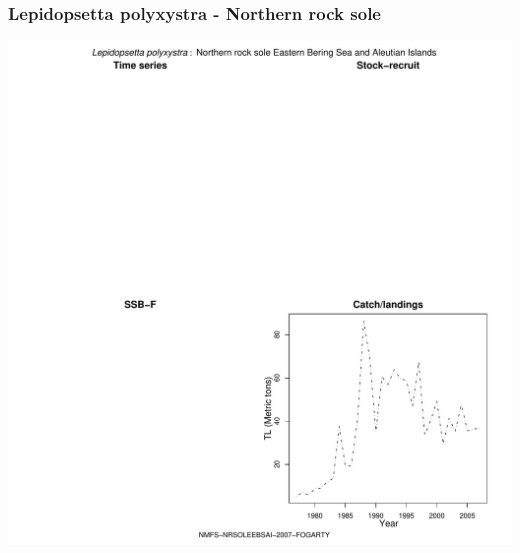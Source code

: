 \subsubsection{Lepidopsetta polyxystra - Northern rock sole}
\begin{center}
\includegraphics[width=1.2\textwidth]{../R/figures/NMFS-NRSOLEEBSAI-2007-FOGARTY.pdf}
\end{center}

